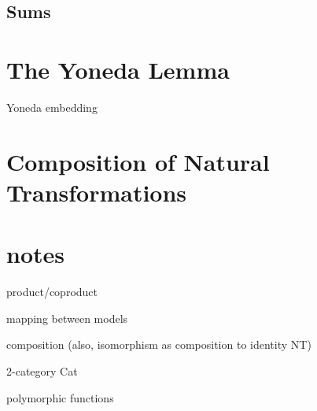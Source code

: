 \documentclass[DaoFP]{subfiles}
\begin{document}
\subsection{Sums}



\section{The Yoneda Lemma}

Yoneda embedding

\section{Composition of Natural Transformations}

\section{notes}

product/coproduct

mapping between models

composition (also, isomorphism as composition to identity NT)

2-category Cat

polymorphic functions

\begin{exercise}
\end{exercise}
\begin{haskell}
\end{haskell}
\[
 \begin{tikzcd}
  \end{tikzcd}
\]
\end{document}
